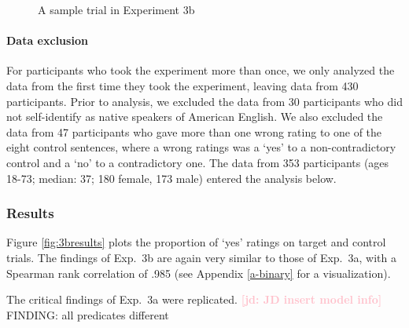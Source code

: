 \documentclass[11pt,fleqn]{article}
\newcommand{\jd}[1]{\textbf{\textcolor{Pink}{[jd: #1]}}}
\newcommand{\6}{\mbox{$[\hspace*{-.6mm}[$}}
\newcommand{\9}{\mbox{$]\hspace*{-.6mm}]$}}
\begin{document}
{\begin{figure}[h!]
\begin{center}
\end{center}
\caption{A sample trial in Experiment 3b}\label{fig-trial-exp3b}
\end{figure}


\paragraph{Data exclusion} For participants who took the experiment more than once, we only analyzed the data from the first time they took the experiment, leaving data from 430 participants. Prior to analysis, we excluded the data from 30 participants who did not self-identify as native speakers of American English. We also excluded the data from 47 participants who gave more than one wrong rating to one of the eight control sentences, where a wrong ratings was a `yes' to a non-contradictory control and a `no' to a contradictory one. The data from 353 participants (ages 18-73; median: 37; 180 female, 173 male) entered the analysis below. 
    


\subsubsection{Results}

Figure \ref{fig:3bresults} plots the proportion of `yes' ratings on target and control trials. The findings of Exp.~3b are again very similar to those of Exp.~3a, with a Spearman rank correlation of .985 (see Appendix \ref{a-binary} for a visualization).

The critical findings of Exp.~3a were replicated.  \jd{JD insert model info} FINDING: all predicates different

}
\end{document}
